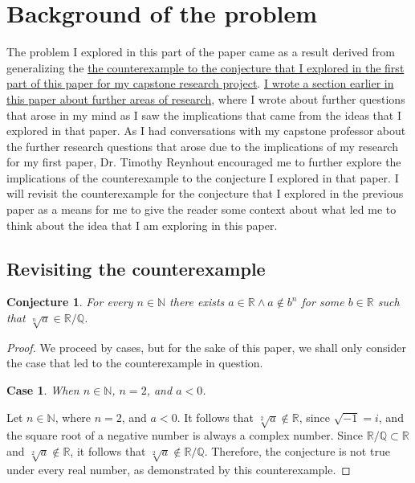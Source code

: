 \documentclass{article}
\newtheorem*{conjecture*}{Conjecture}
\newtheorem{case*}{Case}
\begin{document}
\section{Background of the problem}
\label{sec:headings2} 
The problem I explored in this part of the paper came as a result derived from generalizing the \hyperlink{counterexample from paper 1}{the counterexample to the conjecture  that I explored in the first part of this paper for my capstone research project}. \hyperlink{Areas or ideas for further research}{I wrote a section earlier in this paper about further areas of research}, where I wrote about further questions that arose in my mind as I saw the implications that came from the ideas that I explored in that paper. As I had conversations with my capstone professor about the further research questions that arose due to the implications of my research for my first paper, Dr. Timothy Reynhout encouraged me to further explore the implications of the counterexample to the conjecture I explored in that paper. I will revisit the counterexample for the conjecture that I explored in the previous paper as a means for me to give the reader some context about what led me to think about the idea that I am exploring in this paper. 

\subsection{Revisiting the counterexample}\hypertarget{counterexample from paper 1}{} 

\begin{conjecture*}
  For every \(n \in \mathds{N}\) there exists \(a \in \mathds{R} \wedge a \notin  b^n\) for some \(b \in \mathds{R}\) such that \(\sqrt[n]{a} \in \mathds{R}/\mathds{Q}\). 
\end{conjecture*}  

\begin{proof}
    We proceed by cases, but for the sake of this paper, we shall only consider the case that led to the counterexample in question.  

    \begin{case*}
       When \(n \in \mathds{N}\), \(n = 2\), and \(a < 0\). 
   \end{case*} 

Let \(n \in \mathds{N}\), where \(n = 2\), and \(a < 0\). It follows that \(\sqrt[2]{a} \notin \mathds{R}\), since \(\sqrt{-1} = i\), and the square root of a negative number is always a complex number. Since \(\mathds{R/Q} \subset \mathds{R}\) and \(\sqrt[2]{a} \notin \mathds{R}\), it follows that \(\sqrt[2]{a} \notin \mathds{R/Q}\). Therefore, the conjecture is not true under every real number, as demonstrated by this counterexample.

\end{proof} 
\end{document}
